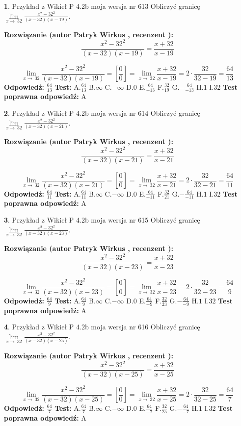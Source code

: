 \documentclass[12pt, a4paper]{article}
\theoremstyle{definition} %
\newtheorem{zad}{}
\newcommand{\zadStart}[1]{\begin{zad}#1\newline}
\newcommand{\zadStop}{\end{zad}}
\newcommand{\rozwStart}[2]{\noindent \textbf{Rozwiązanie (autor #1 , recenzent #2): }\newline}
\newcommand{\rozwStop}{\newline}
\newcommand{\odpStart}{\noindent \textbf{Odpowiedź:}\newline}
\newcommand{\odpStop}{\newline}
\newcommand{\testStart}{\noindent \textbf{Test:}\newline}
\newcommand{\testStop}{\newline}
\newcommand{\kluczStart}{\noindent \textbf{Test poprawna odpowiedź:}\newline}
\newcommand{\kluczStop}{\newline}
\begin{document}
\zadStart{Przykład z Wikieł P 4.2b moja wersja nr 613}
Obliczyć granicę $\lim\limits_{x\to\ 32}\frac{x^{2}-32^{2}}{(x-32)(x-19)}$.
\zadStop
\rozwStart{Patryk Wirkus}{}
$$\frac{x^{2}-32^{2}}{(x-32)(x-19)}=\frac{x+32}{x-19}$$

$$\lim\limits_{x\to\ 32}\frac{x^{2}-32^{2}}{(x-32)(x-19)}=[\frac{0}{0}]=\lim\limits_{x\to\ 32}\frac{x+32}{x-19}=2 \cdot \frac{32}{32-19} = \frac{64}{13}$$
\rozwStop
\odpStart
$\frac{64}{13}$
\odpStop
\testStart
A.$\frac{64}{13}$
B.$\infty$
C.$-\infty$
D.$0$
E.$\frac{64}{-13}$
F.$\frac{32}{19}$
G.$-\frac{64}{-13}$
H.$1$
I.$32$
\testStop
\kluczStart
A
\kluczStop



\zadStart{Przykład z Wikieł P 4.2b moja wersja nr 614}
Obliczyć granicę $\lim\limits_{x\to\ 32}\frac{x^{2}-32^{2}}{(x-32)(x-21)}$.
\zadStop
\rozwStart{Patryk Wirkus}{}
$$\frac{x^{2}-32^{2}}{(x-32)(x-21)}=\frac{x+32}{x-21}$$

$$\lim\limits_{x\to\ 32}\frac{x^{2}-32^{2}}{(x-32)(x-21)}=[\frac{0}{0}]=\lim\limits_{x\to\ 32}\frac{x+32}{x-21}=2 \cdot \frac{32}{32-21} = \frac{64}{11}$$
\rozwStop
\odpStart
$\frac{64}{11}$
\odpStop
\testStart
A.$\frac{64}{11}$
B.$\infty$
C.$-\infty$
D.$0$
E.$\frac{64}{-11}$
F.$\frac{32}{21}$
G.$-\frac{64}{-11}$
H.$1$
I.$32$
\testStop
\kluczStart
A
\kluczStop



\zadStart{Przykład z Wikieł P 4.2b moja wersja nr 615}
Obliczyć granicę $\lim\limits_{x\to\ 32}\frac{x^{2}-32^{2}}{(x-32)(x-23)}$.
\zadStop
\rozwStart{Patryk Wirkus}{}
$$\frac{x^{2}-32^{2}}{(x-32)(x-23)}=\frac{x+32}{x-23}$$

$$\lim\limits_{x\to\ 32}\frac{x^{2}-32^{2}}{(x-32)(x-23)}=[\frac{0}{0}]=\lim\limits_{x\to\ 32}\frac{x+32}{x-23}=2 \cdot \frac{32}{32-23} = \frac{64}{9}$$
\rozwStop
\odpStart
$\frac{64}{9}$
\odpStop
\testStart
A.$\frac{64}{9}$
B.$\infty$
C.$-\infty$
D.$0$
E.$\frac{64}{-9}$
F.$\frac{32}{23}$
G.$-\frac{64}{-9}$
H.$1$
I.$32$
\testStop
\kluczStart
A
\kluczStop



\zadStart{Przykład z Wikieł P 4.2b moja wersja nr 616}
Obliczyć granicę $\lim\limits_{x\to\ 32}\frac{x^{2}-32^{2}}{(x-32)(x-25)}$.
\zadStop
\rozwStart{Patryk Wirkus}{}
$$\frac{x^{2}-32^{2}}{(x-32)(x-25)}=\frac{x+32}{x-25}$$

$$\lim\limits_{x\to\ 32}\frac{x^{2}-32^{2}}{(x-32)(x-25)}=[\frac{0}{0}]=\lim\limits_{x\to\ 32}\frac{x+32}{x-25}=2 \cdot \frac{32}{32-25} = \frac{64}{7}$$
\rozwStop
\odpStart
$\frac{64}{7}$
\odpStop
\testStart
A.$\frac{64}{7}$
B.$\infty$
C.$-\infty$
D.$0$
E.$\frac{64}{-7}$
F.$\frac{32}{25}$
G.$-\frac{64}{-7}$
H.$1$
I.$32$
\testStop
\kluczStart
A
\kluczStop
\end{document}
